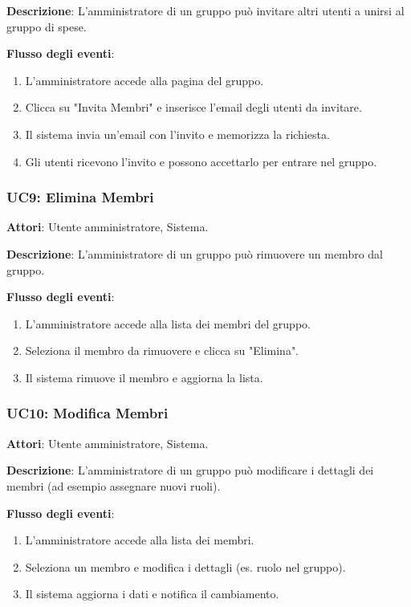 \textbf{Descrizione}: L’amministratore di un gruppo può invitare altri utenti a unirsi al gruppo di spese.

\textbf{Flusso degli eventi}:
\begin{enumerate}
    \item L’amministratore accede alla pagina del gruppo.
    \item Clicca su "Invita Membri" e inserisce l’email degli utenti da invitare.
    \item Il sistema invia un’email con l’invito e memorizza la richiesta.
    \item Gli utenti ricevono l’invito e possono accettarlo per entrare nel gruppo.
\end{enumerate}

\subsubsection{UC9: Elimina Membri}
\textbf{Attori}: Utente amministratore, Sistema.

\textbf{Descrizione}: L’amministratore di un gruppo può rimuovere un membro dal gruppo.

\textbf{Flusso degli eventi}:
\begin{enumerate}
    \item L’amministratore accede alla lista dei membri del gruppo.
    \item Seleziona il membro da rimuovere e clicca su "Elimina".
    \item Il sistema rimuove il membro e aggiorna la lista.
\end{enumerate}

\subsubsection{UC10: Modifica Membri}
\textbf{Attori}: Utente amministratore, Sistema.

\textbf{Descrizione}: L’amministratore di un gruppo può modificare i dettagli dei membri (ad esempio assegnare nuovi ruoli).

\textbf{Flusso degli eventi}:
\begin{enumerate}
    \item L’amministratore accede alla lista dei membri.
    \item Seleziona un membro e modifica i dettagli (es. ruolo nel gruppo).
    \item Il sistema aggiorna i dati e notifica il cambiamento.
\end{enumerate}

